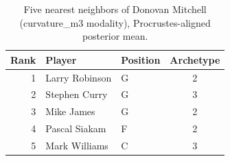 \begin{table}[htbp]
  \centering\small
  \begin{tabular}{rllc}
    \toprule
    Rank & Player & Position & Archetype \\
    \midrule
    1 & Larry Robinson & G & 2 \\
    2 & Stephen Curry & G & 3 \\
    3 & Mike James & G & 2 \\
    4 & Pascal Siakam & F & 2 \\
    5 & Mark Williams & C & 3 \\
    \bottomrule
  \end{tabular}
  \caption{Five nearest neighbors of Donovan Mitchell (curvature_m3 modality), Procrustes-aligned posterior mean.}
  \label{tab:Donovan_Mitchell_neighbors_curvature_m3}
\end{table}

